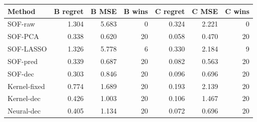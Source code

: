 \begin{tabular}{lrrrrrr}
\toprule
Method & B regret & B MSE & B wins & C regret & C MSE & C wins \\
\midrule
SOF-raw & 1.304 & 5.683 & 0 & 0.324 & 2.221 & 0 \\
SOF-PCA & 0.338 & 0.620 & 20 & 0.058 & 0.470 & 20 \\
SOF-LASSO & 1.326 & 5.778 & 6 & 0.330 & 2.184 & 9 \\
SOF-pred & 0.339 & 0.687 & 20 & 0.082 & 0.563 & 20 \\
SOF-dec & 0.303 & 0.846 & 20 & 0.096 & 0.696 & 20 \\
Kernel-fixed & 0.774 & 1.689 & 20 & 0.193 & 2.139 & 20 \\
Kernel-dec & 0.426 & 1.003 & 20 & 0.106 & 1.467 & 20 \\
Neural-dec & 0.405 & 1.134 & 20 & 0.072 & 0.696 & 20 \\
\bottomrule
\end{tabular}
